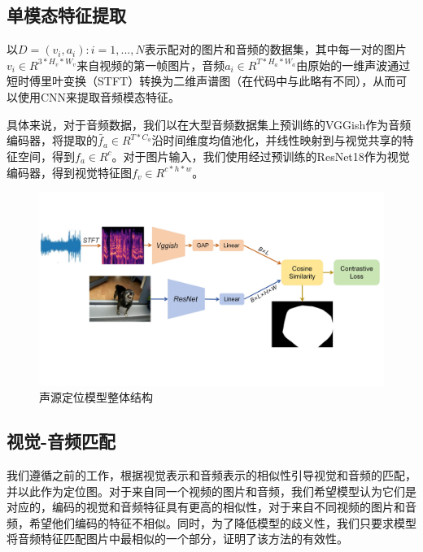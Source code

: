 \documentclass[12pt]{article}
\begin{document}
\subsection{单模态特征提取}\label{encoder}
以$D={(v_i,a_i):i=1,...,N}$表示配对的图片和音频的数据集，其中每一对的图片$v_i \in R^{3*H_v*W_v}$来自视频的第一帧图片，音频$a_i \in R^{T*H_a*W_a}$由原始的一维声波通过短时傅里叶变换（STFT）转换为二维声谱图（在代码中与此略有不同），从而可以使用CNN来提取音频模态特征。

具体来说，对于音频数据，我们以在大型音频数据集上预训练的VGGish\cite{vggish}作为音频编码器，将提取的$\widetilde{f_a}\in R^{T*C_a}$沿时间维度均值池化，并线性映射到与视觉共享的特征空间，得到$f_a \in R^c$。对于图片输入，我们使用经过预训练的ResNet18作为视觉编码器，得到视觉特征图$f_v \in R^{c*h*w}$。
\begin{figure}[!h]
  \centering
  \includegraphics[width=1\linewidth]{model1.jpg}
  \caption{声源定位模型整体结构}
    \label{refmodel2}
\end{figure}
\subsection{视觉-音频匹配}\label{loss}
我们遵循之前的工作\cite{10,22}，根据视觉表示和音频表示的相似性引导视觉和音频的匹配，并以此作为定位图。对于来自同一个视频的图片和音频，我们希望模型认为它们是对应的，编码的视觉和音频特征具有更高的相似性，对于来自不同视频的图片和音频，希望他们编码的特征不相似。同时，为了降低模型的歧义性，我们只要求模型将音频特征匹配图片中最相似的一个部分，\cite{22}证明了该方法的有效性。
\end{document}
